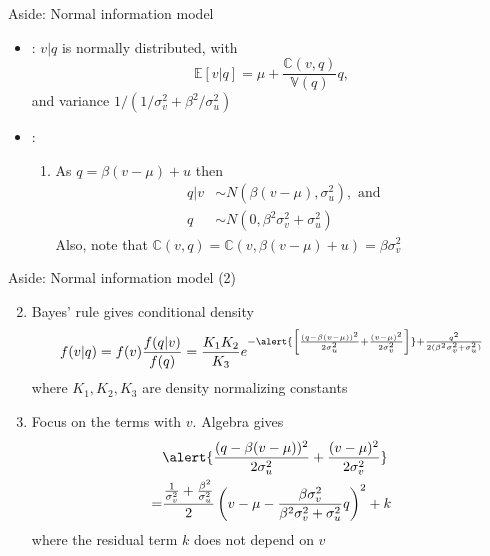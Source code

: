 \documentclass[english,10pt]{beamer}
\begin{document}
\begin{frame}{Aside: Normal information model}
\begin{itemize}
	\item {}: $v|q$ is normally distributed, with
	\[
	\mathbb{E}[v|q] = \mu + \frac{\mathbb{C}(v,q)}{\mathbb{V}(q)} q,
	\]
	and variance $1/(1/\sigma^2_v + \beta^2 / \sigma^2_u)$
	\item {}:
	\begin{enumerate}
		\item As $q=\beta(v-\mu) + u$ then 
		\begin{align*}
		q|v & \sim N(\beta(v-\mu), \sigma^2_u), \text{ and} \\
		q    & \sim N(0, \beta^2 \sigma^2_v+\sigma^2_u)
		\end{align*}
		Also, note that $\mathbb{C}(v,q)= \mathbb{C}(v, \beta(v-\mu)+u)=\beta\sigma^2_v$
	\end{enumerate}
\end{itemize}
\end{frame}


\begin{frame}{Aside: Normal information model (2)}
	\begin{enumerate}
		\setcounter{enumi}{1}
		\item Bayes' rule gives conditional density
		\[
		f(v|q) = f(v) \frac{f(q|v)}{f(q)} = \frac{K_1 K_2}{K_3} e^{-\alert{\left[\frac{(q-\beta(v-\mu))^2}{2\sigma^2_u }+\frac{(v-\mu)^2}{2\sigma^2_v}\right]} + \frac{q^2}{2(\beta^2 \sigma^2_v + \sigma^2_u)}}
		\]
		where $K_1, K_2, K_3$ are density normalizing constants
		\item Focus on the terms with \alert{$v$}. Algebra gives
		\begin{align*}
		&\alert{\frac{(q-\beta(v-\mu))^2}{2\sigma^2_u} + \frac{(v-\mu)^2}{2\sigma^2_v} }\\
		= &\frac{\frac{1}{\sigma^2_v}+\frac{\beta^2}{\sigma^2_u}}{2}\left(v-\mu-\frac{\beta \sigma^2_v}{\beta^2 \sigma^2_v + \sigma^2_u}q \right)^2 + k
		\end{align*}
		where the residual term $k$ does not depend on $v$
	\end{enumerate}
\end{frame}
\end{document}
